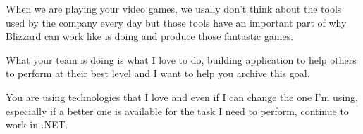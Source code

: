 
When we are playing your video games, we usally don't think about the tools used by the company every day but those tools have an important part of why Blizzard can work like is doing and produce those fantastic games.

What your team is doing is what I love to do, building application to help others to perform at their best level and I want to help you archive this goal.

You are using technologies that I love and even if I can change the one I'm using, especially if a better one is available for the task I need to perform, continue to work in .NET.
